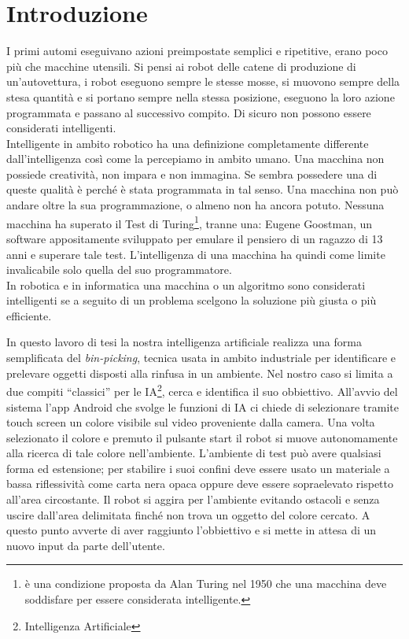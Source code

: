\chapter*{Introduzione}
\fancyfoot[C]{\thepage } 
I primi automi eseguivano azioni preimpostate semplici e ripetitive, erano poco 
più che macchine utensili. Si pensi ai robot delle catene di produzione di un'autovettura, 
i robot eseguono sempre le stesse mosse, si muovono sempre della stesa quantità 
e si portano sempre nella stessa posizione, eseguono la loro azione programmata 
e passano al successivo compito. Di sicuro non possono essere considerati intelligenti.\\
Intelligente in ambito robotico ha una definizione completamente differente 
dall'intelligenza così come la percepiamo in ambito umano. Una macchina non 
possiede creatività, non impara e non immagina. Se sembra possedere una di queste 
qualità è perché è stata programmata in tal senso. Una macchina non può andare oltre 
la sua programmazione, o almeno non ha ancora potuto. Nessuna macchina ha superato 
il Test di Turing\footnote{è una condizione proposta da Alan Turing nel 1950 
che una macchina deve soddisfare per essere considerata intelligente.}, tranne 
una: Eugene Goostman, un software appositamente sviluppato per emulare il pensiero 
di un ragazzo di 13 anni e superare tale test. 
L'intelligenza di una macchina ha quindi come limite invalicabile solo quella 
del suo programmatore.\\
In robotica e in informatica una macchina o un algoritmo sono considerati intelligenti
se a seguito di un problema scelgono la soluzione più giusta o più efficiente.

In questo lavoro di tesi la nostra intelligenza artificiale realizza una forma semplificata del \emph{bin-picking},
tecnica usata in ambito industriale per identificare e prelevare oggetti 
disposti alla rinfusa in un ambiente. Nel nostro caso si limita a due compiti 
``classici'' per le IA\footnote{Intelligenza Artificiale}, cerca e identifica 
il suo obbiettivo. All'avvio del sistema l'app Android che svolge le funzioni di IA
ci chiede di selezionare tramite touch screen un colore visibile sul video 
proveniente dalla camera. Una volta selezionato il colore e premuto il pulsante start 
il robot si muove autonomamente alla ricerca di tale colore nell'ambiente. L'ambiente di test
può avere qualsiasi forma ed estensione; per stabilire i suoi confini deve essere usato un 
materiale a bassa riflessività come carta nera opaca oppure deve essere sopraelevato rispetto 
all'area circostante. Il robot si aggira per l'ambiente evitando ostacoli e senza 
uscire dall'area delimitata finché non trova un oggetto del colore cercato. 
A questo punto avverte di aver raggiunto l'obbiettivo e si mette in attesa di un nuovo 
input da parte dell'utente.

